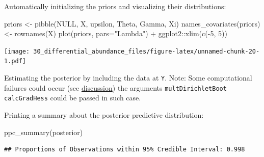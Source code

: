 \documentclass[
]{book}
\newenvironment{Shaded}{\begin{snugshade}}{\end{snugshade}}
\newcommand{\AttributeTok}[1]{\textcolor[rgb]{0.77,0.63,0.00}{#1}}
\newcommand{\CommentTok}[1]{\textcolor[rgb]{0.56,0.35,0.01}{\textit{#1}}}
\newcommand{\ConstantTok}[1]{\textcolor[rgb]{0.00,0.00,0.00}{#1}}
\newcommand{\DecValTok}[1]{\textcolor[rgb]{0.00,0.00,0.81}{#1}}
\newcommand{\FloatTok}[1]{\textcolor[rgb]{0.00,0.00,0.81}{#1}}
\newcommand{\FunctionTok}[1]{\textcolor[rgb]{0.00,0.00,0.00}{#1}}
\newcommand{\NormalTok}[1]{#1}
\newcommand{\OtherTok}[1]{\textcolor[rgb]{0.56,0.35,0.01}{#1}}
\newcommand{\SpecialCharTok}[1]{\textcolor[rgb]{0.00,0.00,0.00}{#1}}
\newcommand{\StringTok}[1]{\textcolor[rgb]{0.31,0.60,0.02}{#1}}
\begin{document}
Automatically initializing the priors and visualizing their distributions:

\begin{Shaded}
\begin{Highlighting}[]
\NormalTok{priors }\OtherTok{\textless{}{-}} \FunctionTok{pibble}\NormalTok{(}\ConstantTok{NULL}\NormalTok{, X, upsilon, Theta, Gamma, Xi)}
\FunctionTok{names\_covariates}\NormalTok{(priors) }\OtherTok{\textless{}{-}} \FunctionTok{rownames}\NormalTok{(X)}
\FunctionTok{plot}\NormalTok{(priors, }\AttributeTok{pars=}\StringTok{"Lambda"}\NormalTok{) }\SpecialCharTok{+}\NormalTok{ ggplot2}\SpecialCharTok{::}\FunctionTok{xlim}\NormalTok{(}\FunctionTok{c}\NormalTok{(}\SpecialCharTok{{-}}\DecValTok{5}\NormalTok{, }\DecValTok{5}\NormalTok{))}
\end{Highlighting}
\end{Shaded}

\texttt{[image: 30\_differential\_abundance\_files/figure-latex/unnamed-chunk-20-1.pdf]}

Estimating the posterior by including the data at \texttt{Y}.
Note: Some computational failures could occur (see \href{https://github-wiki-see.page/m/jsilve24/fido/wiki/Frequently-Asked-Questions}{discussion})
the arguments \texttt{multDirichletBoot} \texttt{calcGradHess} could be passed in such case.

\begin{Shaded}
\end{Shaded}

Printing a summary about the posterior predictive distribution:

\begin{Shaded}
\begin{Highlighting}[]
\FunctionTok{ppc\_summary}\NormalTok{(posterior)}
\end{Highlighting}
\end{Shaded}

\begin{verbatim}
## Proportions of Observations within 95% Credible Interval: 0.998
\end{verbatim}
\end{document}
